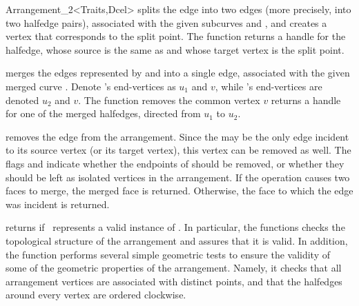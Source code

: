 \begin{ccRefClass}{Arrangement_2<Traits,Dcel>}
  {splits the edge  into two edges (more precisely, into two halfedge
   pairs), associated with the given subcurves  and , and
   creates a vertex that corresponds to the split point. 
   The function returns a handle for the halfedge, whose source is the same
   as  and whose target vertex is the split point.
   }

  {merges the edges represented by  and  into
   a single edge, associated with the given merged curve .
   Denote 's end-vertices as $u_1$ and $v$, while 's
   end-vertices are denoted $u_2$ and $v$. The function removes the
   common vertex $v$ returns a handle for one of the merged halfedges,
   directed from $u_1$ to $u_2$.
   }

  {removes the edge  from the arrangement. Since the  may
   be the only edge incident to its source vertex (or its target vertex),
   this vertex can be removed as well. The flags  and
    indicate whether the endpoints of  should be
   removed, or whether they should be left as isolated vertices in the
   arrangement.
   If the operation causes two faces to merge, the merged face is returned.
   Otherwise, the face to which the edge was incident is returned.}


   {returns  if \ccVar\ represents a valid instance of 
   \ccClassTemplateName. In particular, the functions checks the topological 
    structure of the arrangement and assures that it is valid. In addition, 
    the function performs several simple geometric tests to ensure the 
    validity of some of the geometric properties of the arrangement. Namely, 
    it checks that all arrangement vertices are associated with distinct
    points, and that the halfedges around every vertex are ordered clockwise.}


\end{ccRefClass}
